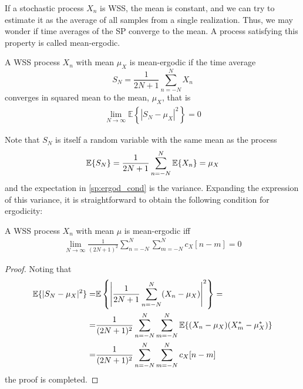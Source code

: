 If a stochastic process $X_n$ is WSS, the mean is constant, and we can try to estimate it as the average of all samples from a single realization. Thus, we may wonder if time averages of the SP converge to the mean. A process satisfying this property is called mean-ergodic.

\begin{definition}

A WSS process $X_n$ with mean $\mu_X$ is mean-ergodic if the time average
\begin{equation}
  S_N = \frac{1}{2N + 1} \sum_{n=-N}^N X_n
\end{equation}
converges in squared mean to the mean, $\mu_X$, that is
\begin{align}
\lim_{N \rightarrow \infty} \mathbb{E}\left\{\left| S_N - \mu_X \right|^2\right\} = 0
\label{sp:ergod_cond}
\end{align}

\end{definition}

Note that $S_N$ is itself a random variable with the same mean as the process
\begin{equation}
\mathbb{E}\{S_N\} = \frac{1}{2N+1} \sum_{n=-N}^N \mathbb{E}\{X_n\} = \mu{}_X
\end{equation}
and the expectation in \eqref{sp:ergod_cond} is the variance. Expanding the expression of this variance, it is straightforward to obtain the following condition for ergodicity:

\begin{theorem}

A WSS process $X_n$ with mean $\mu$ is mean-ergodic iff
\begin{align}
\lim_{N \rightarrow \infty} \frac{1}{(2N+1)^2} \sum_{n=-N}^N\sum_{m=-N}^N  c_X[n-m] = 0
\label{AverageVar0}
\end{align}

\end{theorem}

\begin{proof}

Noting that
\begin{align}
\mathbb{E}\{|S_N - \mu_X|^2\} 
    =& \mathbb{E}\left\{\left| \frac{1}{2N+1} \sum_{n=-N}^N (X_n-\mu_X) \right|^2 \right\} =                \nonumber\\
    =& \frac{1}{(2N+1)^2} \sum_{n=-N}^N \sum_{m=-N}^N \mathbb{E}\{(X_n-\mu_X)(X_m^*-\mu_X^*) \}  \nonumber\\
    =& \frac{1}{(2N+1)^2} \sum_{n=-N}^N \sum_{m=-N}^N  c_X[n-m]
\label{AverageVar1}
\end{align}
the proof is completed.
\end{proof}

